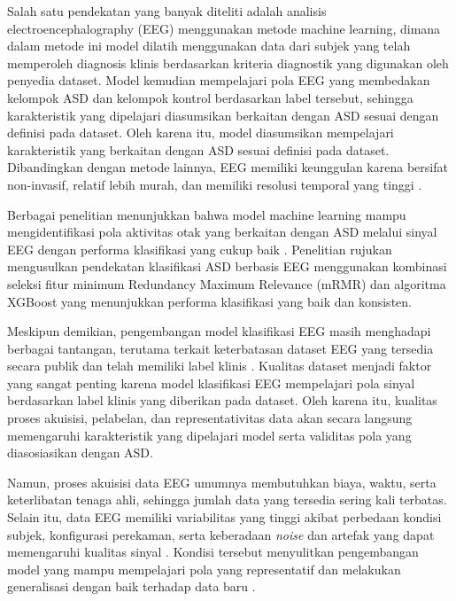 Salah satu pendekatan yang banyak diteliti adalah analisis electroencephalography (EEG) menggunakan metode machine learning, dimana dalam metode ini model dilatih menggunakan data dari subjek yang telah memperoleh diagnosis klinis berdasarkan kriteria diagnostik yang digunakan oleh penyedia dataset. Model kemudian mempelajari pola EEG yang membedakan kelompok ASD dan kelompok kontrol berdasarkan label tersebut, sehingga karakteristik yang dipelajari diasumsikan berkaitan dengan ASD sesuai dengan definisi pada dataset. Oleh karena itu, model diasumsikan mempelajari karakteristik yang berkaitan dengan ASD sesuai definisi pada dataset. Dibandingkan dengan metode lainnya, EEG memiliki keunggulan karena bersifat non-invasif, relatif lebih murah, dan memiliki resolusi temporal yang tinggi \cite{brain_imaging_asd_review} \cite{eeg_dataset_asd}. 

Berbagai penelitian menunjukkan bahwa model machine learning mampu mengidentifikasi pola aktivitas otak yang berkaitan dengan ASD melalui sinyal EEG dengan performa klasifikasi yang cukup baik \cite{eeg_autism_review}. Penelitian rujukan \cite{paper_ref} mengusulkan pendekatan klasifikasi ASD berbasis EEG menggunakan kombinasi seleksi fitur minimum Redundancy Maximum Relevance (mRMR) dan algoritma XGBoost yang menunjukkan performa klasifikasi yang baik dan konsisten.

Meskipun demikian, pengembangan model klasifikasi EEG masih menghadapi berbagai tantangan, terutama terkait keterbatasan dataset EEG yang tersedia secara publik dan telah memiliki label klinis \cite{dl_eeg_review}. Kualitas dataset menjadi faktor yang sangat penting karena model klasifikasi EEG mempelajari pola sinyal berdasarkan label klinis yang diberikan pada dataset. Oleh karena itu, kualitas proses akuisisi, pelabelan, dan representativitas data akan secara langsung memengaruhi karakteristik yang dipelajari model serta validitas pola yang diasosiasikan dengan ASD. 

Namun, proses akuisisi data EEG umumnya membutuhkan biaya, waktu, serta keterlibatan tenaga ahli, sehingga jumlah data yang tersedia sering kali terbatas. Selain itu, data EEG memiliki variabilitas yang tinggi akibat perbedaan kondisi subjek, konfigurasi perekaman, serta keberadaan \textit{noise} dan artefak yang dapat memengaruhi kualitas sinyal \cite{artifact_removal_eeg}.  Kondisi tersebut menyulitkan pengembangan model yang mampu mempelajari pola yang representatif dan melakukan generalisasi dengan baik terhadap data baru \cite{eeg_limited_data}.

